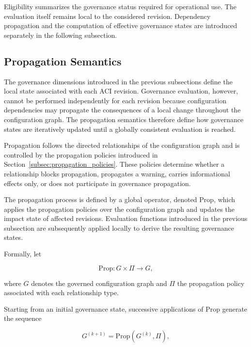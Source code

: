 \documentclass[10pt]{article}
\begin{document}
Eligibility summarizes the governance status required for operational use. The evaluation itself remains local to the considered revision. Dependency propagation and the computation of effective governance states are introduced separately in the following subsection.

\subsection{Propagation Semantics}
\label{subsec:propagation_semantics}

The governance dimensions introduced in the previous subsections define the
local state associated with each ACI revision. Governance evaluation, however,
cannot be performed independently for each revision because configuration
dependencies may propagate the consequences of a local change throughout the
configuration graph. The propagation semantics therefore define how governance
states are iteratively updated until a globally consistent evaluation is
reached.

Propagation follows the directed relationships of the configuration graph and
is controlled by the propagation policies introduced in
Section~\ref{subsec:propagation_policies}. These policies determine whether a
relationship blocks propagation, propagates a warning, carries informational
effects only, or does not participate in governance propagation.

The propagation process is defined by a global operator,
denoted $\mathrm{Prop}$, which applies the propagation policies over the
configuration graph and updates the impact state of affected revisions.
Evaluation functions introduced in the previous subsection are subsequently
applied locally to derive the resulting governance states.

Formally, let

\begin{equation}
	\label{eq:prop_operator}
	\mathrm{Prop} :
	G \times \Pi
	\rightarrow
	G,
\end{equation}

where $G$ denotes the governed configuration graph and $\Pi$ the propagation
policy associated with each relationship type.

Starting from an initial governance state, successive applications of
$\mathrm{Prop}$ generate the sequence

\begin{equation}
	\label{eq:prop_iteration}
	G^{(k+1)}
	=
	\mathrm{Prop}
	\!\left(
	G^{(k)},
	\Pi
	\right),
\end{equation}
\end{document}

